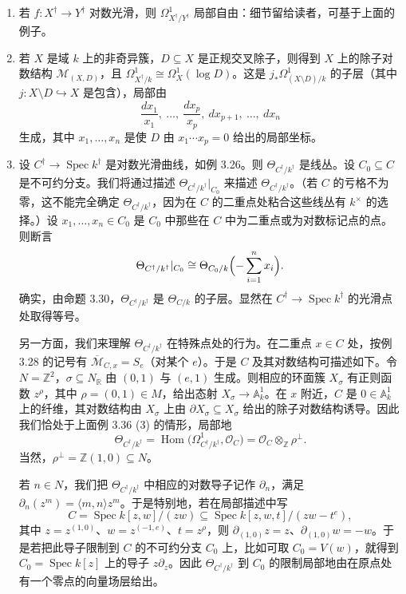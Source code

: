 \begin{examples}
\begin{enumerate}[label=(\arabic*),leftmargin=2.2em,itemsep=3pt]
\item 若 $f:X^{\dagger}\to Y^{\dagger}$ 对数光滑，则 $\Omega^1_{X^{\dagger}/Y^{\dagger}}$ 局部自由：细节留给读者，可基于上面的例子。
\item 若 $X$ 是域 $k$ 上的非奇异簇，$D\subseteq X$ 是正规交叉除子，则得到 $X$ 上的除子对数结构 $\mathcal{M}_{(X,D)}$，且 $\Omega^1_{X^{\dagger}/k}\cong\Omega^1_X(\log D)$。这是 $j_{*}\Omega^1_{(X\setminus D)/k}$ 的子层（其中 $j:X\setminus D\hookrightarrow X$ 是包含），局部由
\[
  \frac{dx_1}{x_1},\ \dots,\ \frac{dx_p}{x_p},\ dx_{p+1},\ \dots,\ dx_n
\]
生成，其中 $x_1,\dots,x_n$ 是使 $D$ 由 $x_1\cdots x_p=0$ 给出的局部坐标。
\item 设 $C^{\dagger}\to\operatorname{Spec} k^{\dagger}$ 是对数光滑曲线，如例 3.26。则 $\Theta_{C^{\dagger}/k^{\dagger}}$ 是线丛。设 $C_0\subseteq C$ 是不可约分支。我们将通过描述 $\Theta_{C^{\dagger}/k^{\dagger}}|_{C_0}$ 来描述 $\Theta_{C^{\dagger}/k^{\dagger}}$。（若 $C$ 的亏格不为零，这不能完全确定 $\Theta_{C^{\dagger}/k^{\dagger}}$，因为在 $C$ 的二重点处粘合这些线丛有 $k^{\times}$ 的选择。）设 $x_1,\dots,x_n\in C_0$ 是 $C_0$ 中那些在 $C$ 中为二重点或为对数标记点的点。则断言
\[
  \Theta_{C^{\dagger}/k^{\dagger}}|_{C_0}
  \cong\Theta_{C_0/k}\Bigl(-\sum_{i=1}^{n}x_i\Bigr).
\]
确实，由命题 3.30，$\Theta_{C^{\dagger}/k^{\dagger}}$ 是 $\Theta_{C/k}$ 的子层。显然在 $C^{\dagger}\to\operatorname{Spec} k^{\dagger}$ 的光滑点处取得等号。

另一方面，我们来理解 $\Theta_{C^{\dagger}/k^{\dagger}}$ 在特殊点处的行为。在二重点 $x\in C$ 处，按例 3.28 的记号有 $\overline{\mathcal{M}}_{C,x}=S_e$（对某个 $e$）。于是 $C$ 及其对数结构可描述如下。令 $N=\mathbb{Z}^2$，$\sigma\subseteq N_{\mathbb{R}}$ 由 $(0,1)$ 与 $(e,1)$ 生成。则相应的环面簇 $X_{\sigma}$ 有正则函数 $z^{\rho}$，其中 $\rho=(0,1)\in M$，给出态射 $X_{\sigma}\to\mathbb{A}^1_k$。在 $x$ 附近，$C$ 是 $0\in\mathbb{A}^1_k$ 上的纤维，其对数结构由 $X_{\sigma}$ 上由 $\partial X_{\sigma}\subseteq X_{\sigma}$ 给出的除子对数结构诱导。因此我们恰处于上面例 3.36 (3) 的情形，局部地
\[
  \Theta_{C^{\dagger}/k^{\dagger}}
  =\operatorname{Hom}\bigl(\Omega^1_{C^{\dagger}/k^{\dagger}},\mathcal{O}_C\bigr)
  =\mathcal{O}_C\otimes_{\mathbb{Z}}\rho^{\perp}.
\]
当然，$\rho^{\perp}=\mathbb{Z}(1,0)\subseteq N$。

若 $n\in N$，我们把 $\Theta_{C^{\dagger}/k^{\dagger}}$ 中相应的对数导子记作 $\partial_n$，满足 $\partial_n(z^m)=\langle m,n\rangle z^m$。于是特别地，若在局部描述中写
\[
  C=\operatorname{Spec} k[z,w]/(zw)\subseteq\operatorname{Spec} k[z,w,t]/(zw-t^e),
\]
其中 $z=z^{(1,0)}$、$w=z^{(-1,e)}$、$t=z^{\rho}$，则 $\partial_{(1,0)}z=z$、$\partial_{(1,0)}w=-w$。于是若把此导子限制到 $C$ 的不可约分支 $C_0$ 上，比如可取 $C_0=V(w)$，就得到 $C_0=\operatorname{Spec} k[z]$ 上的导子 $z\partial_z$。因此 $\Theta_{C^{\dagger}/k^{\dagger}}$ 到 $C_0$ 的限制局部地由在原点处有一个零点的向量场层给出。


\end{enumerate}
\end{examples}
